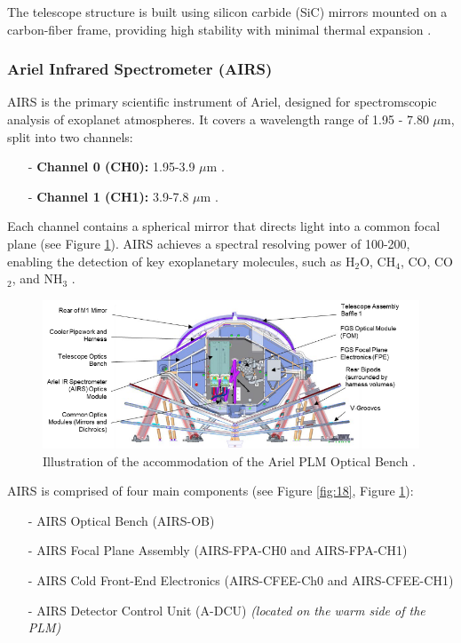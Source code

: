 \documentclass[12pt]{article}
\begin{document}
The telescope structure is built using silicon carbide (SiC) mirrors mounted on a carbon-fiber frame, providing high stability with minimal thermal expansion \cite{ARIEL_M4_Proposal}.

\subsubsection{Ariel Infrared Spectrometer (AIRS)} \label{sec:4.2.3}

AIRS is the primary scientific instrument of Ariel, designed for spectromscopic analysis of exoplanet atmospheres. It covers a wavelength range of 1.95 - 7.80 $\mu$m, split into two channels:

\begin{itemize}
    \item[-] \textbf{Channel 0 (CH0):} 1.95-3.9 $\mu$m \cite{salvignol2024ariel,ARIEL_M4_Proposal}.
    \item[-] \textbf{Channel 1 (CH1):} 3.9-7.8 $\mu$m \cite{salvignol2024ariel,ARIEL_M4_Proposal}.
\end{itemize}

Each channel contains a spherical mirror that directs light into a common focal plane (see Figure \ref{fig:17}). AIRS achieves a spectral resolving power of 100-200, enabling the detection of key exoplanetary molecules, such as
H$_2$O, CH$_4$, CO, CO$_2$, and NH$_3$ \cite{martignac2022airs,ARIEL_M4_Proposal}.

\begin{figure}[H]
    \centering
    \includegraphics[width=.8\textwidth]{plm.png}
    \caption{\centering Illustration of the accommodation of the Ariel PLM Optical Bench \protect\cite{salvignol2024ariel}.}
    \label{fig:17}
\end{figure}

AIRS is comprised of four main components (see Figure \ref{fig:18}, Figure \ref{fig:17}):

\begin{itemize}
    \item[-] AIRS Optical Bench (AIRS-OB)
    \item[-] AIRS Focal Plane Assembly (AIRS-FPA-CH0 and AIRS-FPA-CH1)
    \item[-] AIRS Cold Front-End Electronics (AIRS-CFEE-Ch0 and AIRS-CFEE-CH1)
    \item[-] AIRS Detector Control Unit (A-DCU) \textit{(located on the warm side of the PLM)}
\end{itemize}
\end{document}
